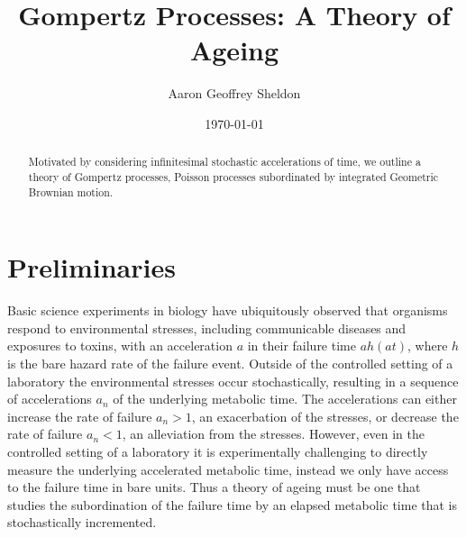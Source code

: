 \documentclass{article}
\theoremstyle{definition}\newtheorem{definition}{Definition}
\begin{document}
  \title{Gompertz Processes: A Theory of Ageing}
  \author{Aaron Geoffrey Sheldon}
  \date{\today}
  \maketitle

  \begin{abstract}
    Motivated by considering infinitesimal stochastic accelerations of time, we outline a
    theory of Gompertz processes, Poisson processes subordinated by integrated Geometric
    Brownian motion.
  \end{abstract}

  \section{Preliminaries}
  Basic science experiments in biology have ubiquitously observed that organisms respond to
  environmental stresses, including communicable diseases and exposures to toxins, with an
  acceleration $a$ in their failure time $a h\left(a t\right)$, where $h$ is the bare hazard
  rate of the failure event. Outside of the controlled setting of a laboratory the
  environmental stresses occur stochastically, resulting in a sequence of accelerations
  $a_n$ of the underlying metabolic time. The accelerations can either increase the rate of
  failure $a_n > 1$, an exacerbation of the stresses, or decrease the rate of failure
  $a_n < 1$, an alleviation from the stresses. However, even in the controlled setting of a
  laboratory it is experimentally challenging to directly measure the underlying accelerated
  metabolic time, instead we only have access to the failure time in bare units. Thus a
  theory of ageing must be one that studies the subordination of the failure time by an 
  elapsed metabolic time that is stochastically incremented.
\end{document}
